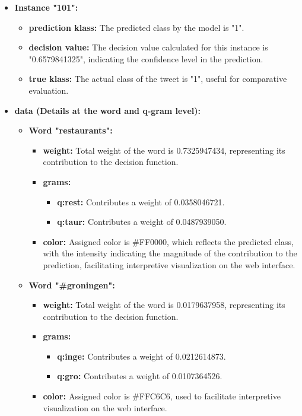 \documentclass[runningheads,10pt]{llncs}
\begin{document}
\begin{itemize}
    \item \textbf{Instance "101":}
    \begin{itemize}
        \item \textbf{prediction klass:} The predicted class by the model is "1".
        \item \textbf{decision value:} The decision value calculated for this instance is "0.6579841325", indicating the confidence level in the prediction.
        \item \textbf{true klass:} The actual class of the tweet is "1", useful for comparative evaluation.
    \end{itemize}
    \item \textbf{data (Details at the word and q-gram level):}
    \begin{itemize}
        \item \textbf{Word "restaurants":}
        \begin{itemize}
            \item \textbf{weight:} Total weight of the word is 0.7325947434, representing its contribution to the decision function.
            \item \textbf{grams:}
            \begin{itemize}
                \item \textbf{q:rest:} Contributes a weight of 0.0358046721.
                \item \textbf{q:taur:} Contributes a weight of 0.0487939050.
            \end{itemize}
            \item \textbf{color:} Assigned color is \#FF0000, which reflects the predicted class, with the intensity indicating the magnitude of the contribution to the prediction, facilitating interpretive visualization on the web interface.
        \end{itemize}
        \item \textbf{Word "\#groningen":}
        \begin{itemize}
            \item \textbf{weight:} Total weight of the word is 0.0179637958, representing its contribution to the decision function.
            \item \textbf{grams:}
            \begin{itemize}
                \item \textbf{q:inge:} Contributes a weight of 0.0212614873.
                \item \textbf{q:gro:} Contributes a weight of 0.0107364526.
            \end{itemize}
            \item \textbf{color:} Assigned color is \#FFC6C6, used to facilitate interpretive visualization on the web interface.           
        \end{itemize}
    \end{itemize}
\end{itemize}
\end{document}
